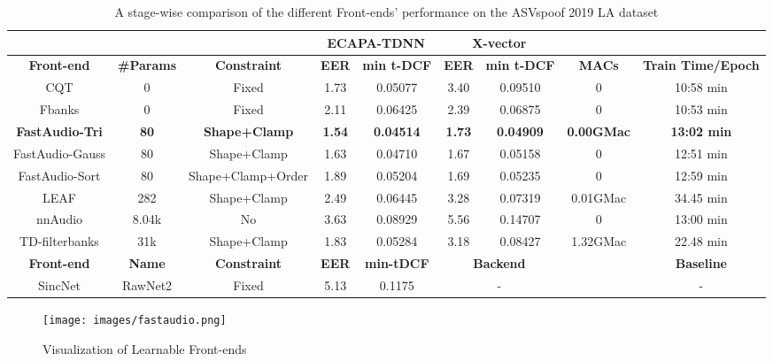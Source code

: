 \documentclass[conference]{IEEEtran}
\begin{document}
\begin{table*}[htbp]
\begin{center}
\caption{\label{table:frontend_compare} A stage-wise comparison of the different Front-ends' performance on the ASVspoof 2019 LA dataset}
  \begin{tabular}{ccccccccc}
  \hline
     & &  & \multicolumn{2}{c}{\textbf{ECAPA-TDNN}} & \multicolumn{2}{c}{\textbf{X-vector}} \\ 
    \hline
    \textbf{Front-end} & \textbf{\#Params} & \textbf{Constraint} & \textbf{EER} & \textbf{min t-DCF}& \textbf{EER} & \textbf{min t-DCF} & \textbf{MACs} & \textbf{Train Time/Epoch} \\ 
    \hline
    CQT & 0 & Fixed & 1.73 &  0.05077 & 3.40 & 0.09510 & 0 & 10:58 min\\
    Fbanks & 0 & Fixed &  2.11 &  0.06425 & 2.39 & 0.06875& 0 & 10:53 min\\
    \textbf{FastAudio-Tri} & \textbf{80} & \textbf{Shape+Clamp} &  \textbf{1.54} &  \textbf{0.04514} &  \textbf{1.73}& \textbf{0.04909}& \textbf{0.00GMac} & \textbf{13:02 min}\\
    FastAudio-Gauss & 80 & Shape+Clamp &  1.63 &  0.04710&  1.67& 0.05158& 0 & 12:51 min\\
    FastAudio-Sort & 80 & Shape+Clamp+Order & 1.89 & 0.05204 &  1.69& 0.05235& 0 & 12:59 min\\
    LEAF & 282 & Shape+Clamp & 2.49 & 0.06445 &  3.28& 0.07319& 0.01GMac & 34.45 min\\
    nnAudio &8.04k & No & 3.63 & 0.08929& 5.56 & 0.14707 & 0 & 13:00 min\\
    TD-filterbanks & 31k & Shape+Clamp&  1.83&  0.05284& 3.18& 0.08427& 1.32GMac & 22.48 min\\
    \hline
    \hline
    \textbf{Front-end} & \textbf{Name} & \textbf{Constraint} & \textbf{EER} & \textbf{min-tDCF}& \multicolumn{2}{c}{\textbf{Backend}} &  &   \textbf{Baseline}\\ 
    \hline
    SincNet & RawNet2 & Fixed &  5.13&  0.1175&   \multicolumn{2}{c}{-} &  &  - \\
    \hline
    
  \end{tabular}
 \end{center}
\end{table*} 


\begin{figure*}[hpbt]
\centering
\texttt{[image: images/fastaudio.png]}
\caption{Visualization of Learnable Front-ends}
\label{fig:learnable}
\end{figure*}
\end{document}
